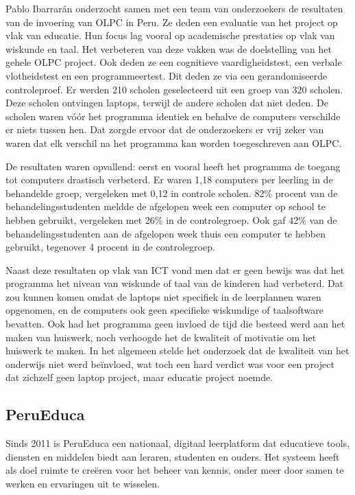 Pablo Ibarrarán onderzocht samen met een team van onderzoekers de resultaten van de invoering van OLPC in Peru. \autocite{Ibarraran2012} Ze deden een evaluatie van het project op vlak van educatie. Hun focus lag vooral op academische prestaties op vlak van wiskunde en taal. Het verbeteren van deze vakken was de doelstelling van het gehele OLPC project. Ook deden ze een cognitieve vaardigheidstest, een verbale vlotheidstest en een programmeertest. Dit deden ze via een gerandomiseerde controleproef. Er werden 210 scholen geselecteerd uit een groep van 320 scholen. Deze scholen ontvingen laptops, terwijl de andere scholen dat niet deden. De scholen waren vóór het programma identiek en behalve de computers verschilde er niets tussen hen. Dat zorgde ervoor dat de onderzoekers er vrij zeker van waren dat elk verschil na het programma kan worden toegeschreven aan OLPC. \autocite{Ibarraran2012}

De resultaten waren opvallend: eerst en vooral heeft het programma de toegang tot computers drastisch verbeterd. Er waren 1,18 computers per leerling in de behandelde groep, vergeleken met 0,12 in controle scholen. 82\% procent van de behandelingsstudenten meldde de afgelopen week een computer op school te hebben gebruikt, vergeleken met 26\% in de controlegroep. Ook gaf 42\% van de behandelingsstudenten aan de afgelopen week thuis een computer te hebben gebruikt, tegenover 4 procent in de controlegroep. \autocite{Ibarraran2012}

Naast deze resultaten op vlak van ICT vond men dat er geen bewijs was dat het programma het niveau van wiskunde of taal van de kinderen had verbeterd. Dat zou kunnen komen omdat de laptops niet specifiek in de leerplannen waren opgenomen, en de computers ook geen specifieke wiskundige of taalsoftware bevatten. Ook had het programma geen invloed de tijd die besteed werd aan het maken van huiswerk, noch verhoogde het de kwaliteit of motivatie om het huiswerk te maken. In het algemeen stelde het onderzoek dat de kwaliteit van het onderwijs niet werd beïnvloed, wat toch een hard verdict was voor een project dat zichzelf geen laptop project, maar educatie project noemde. \autocite{Ibarraran2012}

\subsection{PeruEduca}
Sinds 2011 is PeruEduca een nationaal, digitaal leerplatform dat educatieve tools, diensten en middelen biedt aan leraren, studenten en ouders. Het systeem heeft als doel ruimte te creëren voor het beheer van kennis, onder meer door samen te werken en ervaringen uit te wisselen. \autocite{EducationPeru2020}

